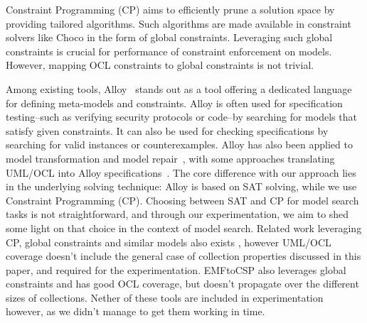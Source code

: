 Constraint Programming (CP) aims to efficiently prune a solution space by providing tailored algorithms. Such algorithms are made available in constraint solvers like Choco \cite{Prudhomme2022-choco} 
in the form of global constraints. 
Leveraging such global
constraints is crucial for performance of constraint enforcement on
models.
However, mapping OCL constraints to global constraints is not trivial.


Among existing tools, Alloy~\cite{Jackson2002-alloy} stands out as a tool offering a dedicated language for defining meta-models and constraints. Alloy is often used for specification testing--such as verifying security protocols or code--by searching for models that satisfy given constraints. 
It can also be used for checking specifications by searching for valid instances or counterexamples. Alloy has also been applied to model transformation and model repair~\cite{alloyMT}, with some approaches translating UML/OCL into Alloy specifications~\cite{uml2alloy, uml2alloy2uml}.
The core difference with our approach lies in the underlying solving technique: Alloy is based on SAT solving, while we use Constraint Programming (CP). Choosing between SAT and CP for model search tasks is not straightforward, and through our experimentation, we aim to shed some light on that choice in the context of model search.
Related work leveraging CP, global constraints and similar models also exists \cite{ferdjoukh_instantiation_2015}, however UML/OCL coverage doesn't include the general case of collection properties discussed in this paper, and required for the experimentation. EMFtoCSP\cite{Gonzalez2012-emf2csp} also leverages global constraints and has good OCL coverage, but doesn't propagate over the different sizes of collections.
Nether of these tools are included in experimentation however, as we didn't manage to get them working in time.



